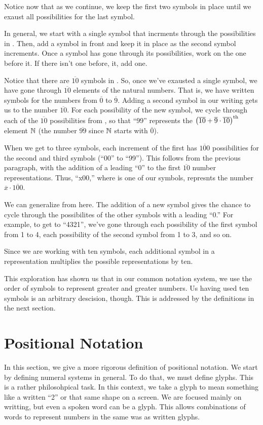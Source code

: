\documentclass{article}
\begin{document}
	Notice now that as we continue, we keep the first two symbols in place until we exaust all possibilities for the last symbol.
	
	In general, we start with a single symbol that incrments through the possibilities in . Then, add a symbol in front and keep it in place as the second symbol increments. Once a symbol has gone through its possibilities, work on the one before it. If there isn't one before, it, add one.
	
	Notice that there are $\overline{10}$ symbols in . So, once we've exausted a single symbol, we have gone through $\overline{10}$ elements of the natural numbers. That is, we have written symbols for the numbers from $\overline{0}$ to $\overline{9}$. Adding a second symbol in our writing gets us to the number $\overline{10}$. For each possibility of the new symbol, we cycle through each of the $\overline{10}$ possibilities from , so that ``99'' represents the $\pqty{\overline{10}+\overline{9}\cdot\overline{10}}^\text{th}$ element $\mathbb{N}$ (the number $\overline{99}$ since $\mathbb{N}$ starts with $\overline{0}$).
	
	When we get to three symbols, each increment of the first has $\overline{100}$ possibilities for the second and third symbols (``00'' to ``99''). This follows from the previous paragraph, with the addition of a leading ``0'' to the first $\overline{10}$ number representations. Thus, ``x00,'' where is one of our symbols, represnts the number $\overline{x}\cdot\overline{100}$.
	
	
	We can generalize from here. The addition of a new symbol gives the chance to cycle through the possibilites of the other symbols with a leading ``0.'' For example, to get to ``4321'', we've gone through each possibility of the first symbol from 1 to 4, each possibility of the second symbol from 1 to 3, and so on. 
	
	Since we are working with ten symbols, each additional symbol in a representation multiplies the possible representations by ten.
	
	This exploration has shown us that in our common notation system, we use the order of symbols to represent greater and greater numbers. Us having used ten symbols is an arbitrary descision, though. This is addressed by the definitions in the next section.
	
	\section{Positional Notation}
	In this section, we give a more rigorous definition of positional notation. We start by defining numeral systems in general. To do that, we must define glyphs. This is a rather philosohpical task. In this context, we take a glyph to mean something like a written ``2'' or that same shape on a screen. We are focused mainly on writting, but even a spoken word can be a glyph. This allows combinations of words to represent numbers in the same was as written glyphs.
	
\end{document}
